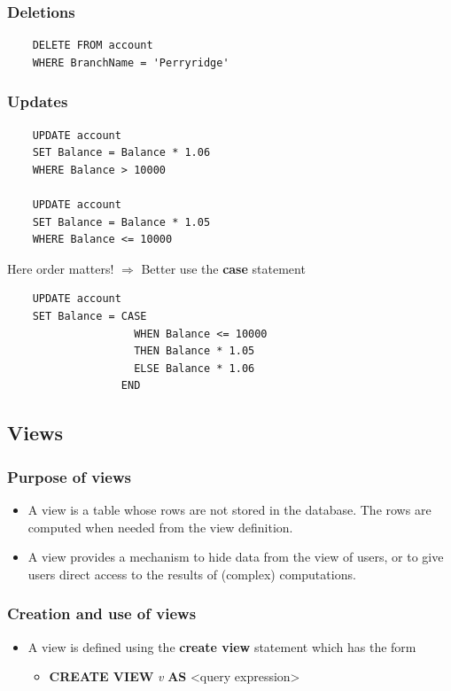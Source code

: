 \subsubsection{Deletions}
\begin{lstlisting}
    DELETE FROM account
    WHERE BranchName = 'Perryridge'
\end{lstlisting}
\subsubsection{Updates}
\begin{lstlisting}
    UPDATE account
    SET Balance = Balance * 1.06
    WHERE Balance > 10000

    UPDATE account 
    SET Balance = Balance * 1.05
    WHERE Balance <= 10000
\end{lstlisting}
Here order matters! $\Rightarrow$ Better use the \textbf{case} statement 
\begin{lstlisting}
    UPDATE account
    SET Balance = CASE 
                    WHEN Balance <= 10000
                    THEN Balance * 1.05
                    ELSE Balance * 1.06
                  END
\end{lstlisting}   

\subsection{Views}


\subsubsection{Purpose of views}

\begin{itemize}[label=\(\rhd\)]
    \item A view is a table whose rows are not stored in the database. The rows are computed when needed from the view definition.
    \item A view provides a mechanism to hide data from the view of users, or to give users direct access to the results of (complex) computations.
\end{itemize}
\subsubsection{Creation and use of views}

\begin{itemize}[label=\(\rhd\)]
    \item A view is defined using the \textbf{create view} statement which has the form 
    \begin{itemize}[label=\(\rhd\)]
        \item[] \textbf{CREATE VIEW} \textit{v} \textbf{AS} <query expression>
    \end{itemize}
\end{itemize}

